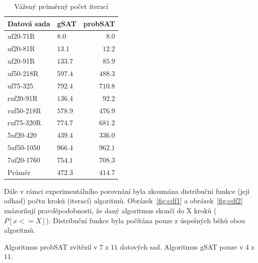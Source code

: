 \documentclass[twoside,twocolumn]{article}
\begin{document}
    \begin{table}
        \caption{Vážený průměrný počet iterací}
        \centering
        \begin{tabular}{llr}
            \toprule
            Datová sada & gSAT    & probSAT \\
            \midrule
            uf20-71R    & $8.0$   & $8.0$   \\
            uf20-81R    & $13.1$  & $12.2$  \\
            uf20-91R    & $133.7$ & $85.9$  \\
            uf50-218R   & $597.4$ & $488.3$ \\
            uf75-325    & $792.4$ & $710.8$ \\
            ruf20-91R   & $136.4$ & $92.2$  \\
            ruf50-218R  & $578.9$ & $476.9$ \\
            ruf75-320R  & $774.7$ & $681.2$ \\
            5uf20-420   & $439.4$ & $336.0$ \\
            5uf50-1050  & $966.4$ & $962.1$ \\
            7uf20-1760  & $754.1$ & $708.3$ \\
            \midrule
            Průměr      & $472.3$ & $414.7$ \\
            \bottomrule
        \end{tabular}
        \label{tab:average_fined_iterations}
    \end{table}

    Dále v rámci experimentálního porovnání byla zkoumána distribuční funkce (její odhad) počtu kroků (iterací) algoritmů.
    Obrázek~\ref{fig:cdf1} a obrázek~\ref{fig:cdf2} znázorňují pravděpodobnosti, že daný algoritmus skončí do X kroků (${P[x <= X]}$).
    Distribuční funkce byla počítána pouze z úspešných běhů obou algoritmů.

    Algoritmus probSAT zvítězil v $7$ z $11$ datových sad.
    Algoritmus gSAT pouze v $4$ z $11$.
\end{document}
